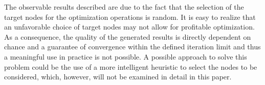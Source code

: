 \documentclass[
	accentcolor=1c,%
	type=intern,
	marginpar=false,
	ruledheaders=section,
	class=report,
	BCOR=5mm,
      parskip=half-,
	fontsize=10pt
	]{tudapub}
\begin{document}
{{			The observable results described are due to the fact that the selection of the target nodes for the optimization operations is random.
			It is easy to realize that an unfavorable choice of target nodes may not allow for profitable optimization.
			As a consequence, the quality of the generated results is directly dependent on chance and a guarantee of convergence within the defined iteration limit and thus a meaningful use in practice is not possible.
			A possible approach to solve this problem could be the use of a more intelligent heuristic to select the nodes to be considered, which, however, will not be examined in detail in this paper.
}


			
}
\end{document}
